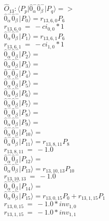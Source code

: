 \documentclass[14pt]{article}
\begin{document}
    $\hat{O}_{13}:  \langle{P_p}\vert \hat{0}_{\alpha}^{-}\hat{0}_{\beta}^{-} \vert{P_q}\rangle => $ \\ 
    $ \hat{0}_{\alpha}^{-}\hat{0}_{\beta}^{-} \vert{P_{0}}\rangle = {r}_{13,6,0}P_{6} $ \\ 
    ${r}_{13,6,0}\ =\ -{ci}_{0,0}*1 $ \\ 
    $ \hat{0}_{\alpha}^{-}\hat{0}_{\beta}^{-} \vert{P_{1}}\rangle = {r}_{13,6,1}P_{6} $ \\ 
    ${r}_{13,6,1}\ =\ -{ci}_{1,0}*1 $ \\ 
    $ \hat{0}_{\alpha}^{-}\hat{0}_{\beta}^{-} \vert{P_{2}}\rangle =  $ \\ 
    $ \hat{0}_{\alpha}^{-}\hat{0}_{\beta}^{-} \vert{P_{3}}\rangle =  $ \\ 
    $ \hat{0}_{\alpha}^{-}\hat{0}_{\beta}^{-} \vert{P_{4}}\rangle =  $ \\ 
    $ \hat{0}_{\alpha}^{-}\hat{0}_{\beta}^{-} \vert{P_{5}}\rangle =  $ \\ 
    $ \hat{0}_{\alpha}^{-}\hat{0}_{\beta}^{-} \vert{P_{6}}\rangle =  $ \\ 
    $ \hat{0}_{\alpha}^{-}\hat{0}_{\beta}^{-} \vert{P_{7}}\rangle =  $ \\ 
    $ \hat{0}_{\alpha}^{-}\hat{0}_{\beta}^{-} \vert{P_{8}}\rangle =  $ \\ 
    $ \hat{0}_{\alpha}^{-}\hat{0}_{\beta}^{-} \vert{P_{9}}\rangle =  $ \\ 
    $ \hat{0}_{\alpha}^{-}\hat{0}_{\beta}^{-} \vert{P_{10}}\rangle =  $ \\ 
    $ \hat{0}_{\alpha}^{-}\hat{0}_{\beta}^{-} \vert{P_{11}}\rangle = {r}_{13,8,11}P_{8} $ \\ 
    ${r}_{13,8,11}\ =\ -1.0 $ \\ 
    $ \hat{0}_{\alpha}^{-}\hat{0}_{\beta}^{-} \vert{P_{12}}\rangle =  $ \\ 
    $ \hat{0}_{\alpha}^{-}\hat{0}_{\beta}^{-} \vert{P_{13}}\rangle = {r}_{13,10,13}P_{10} $ \\ 
    ${r}_{13,10,13}\ =\ -1.0 $ \\ 
    $ \hat{0}_{\alpha}^{-}\hat{0}_{\beta}^{-} \vert{P_{14}}\rangle =  $ \\ 
    $ \hat{0}_{\alpha}^{-}\hat{0}_{\beta}^{-} \vert{P_{15}}\rangle = {r}_{13,0,15}P_{0}+{r}_{13,1,15}P_{1} $ \\ 
    ${r}_{13,0,15}\ =\ -1.0*{inv}_{1,0} $ \\ 
    ${r}_{13,1,15}\ =\ -1.0*{inv}_{1,1} $ \\ 
    
\end{document}
